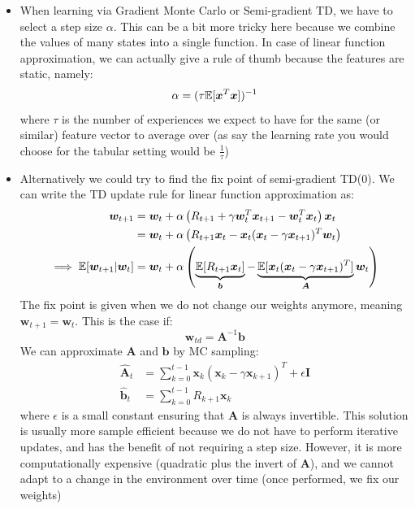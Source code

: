 \begin{itemize}
	\item When learning via Gradient Monte Carlo or Semi-gradient TD, we have to select a step size $\alpha$. This can be a bit more tricky here because we combine the values of many states into a single function. In case of linear function approximation, we can actually give a rule of thumb because the features are static, namely:
	$$\alpha = (\tau\mathbb{E}[\bm{x}^T\bm{x}])^{-1}$$
	where $\tau$ is the number of experiences we expect to have for the same (or similar) feature vector to average over (as say the learning rate you would choose for the tabular setting would be $\frac{1}{\tau}$)
	\item Alternatively we could try to find the fix point of semi-gradient TD(0). We can write the TD update rule for linear function approximation as:
	\begin{equation*}
		\begin{split}
			\bm{w}_{t+1} & = \bm{w}_t + \alpha \left(R_{t+1}+\gamma \bm{w}_t^T \bm{x}_{t+1} - \bm{w}_t^T\bm{x}_t\right)\bm{x}_t\\
			& = \bm{w}_t + \alpha \left(R_{t+1}\bm{x}_t - \bm{x}_t (\bm{x}_t - \gamma \bm{x}_{t+1})^T \bm{w}_t\right)\\
			\implies \mathbb{E}[\bm{w}_{t+1}|\bm{w}_t] & = \bm{w}_t + \alpha \left(\underbrace{\mathbb{E}[R_{t+1}\bm{x}_t]}_{\bm{b}} - \underbrace{\mathbb{E}[\bm{x}_t (\bm{x}_t - \gamma \bm{x}_{t+1})^T]}_{\bm{A}} \bm{w}_t\right)\\
		\end{split}
	\end{equation*}
	The fix point is given when we do not change our weights anymore, meaning $\bm{w}_{t+1}=\bm{w}_t$. This is the case if:
	$$\bm{w}_{td}=\bm{A}^{-1}\bm{b}$$
	We can approximate $\bm{A}$ and $\bm{b}$ by MC sampling:
	\begin{equation*}
		\begin{split}
			\hat{\bm{A}}_t & = \sum_{k=0}^{t-1}\bm{x}_k\left(\bm{x}_k - \gamma\bm{x}_{k+1}\right)^T + \epsilon\bm{I}\\
			\hat{\bm{b}}_t & = \sum_{k=0}^{t-1}R_{k+1}\bm{x}_k
		\end{split}
	\end{equation*}
	where $\epsilon$ is a small constant ensuring that $\bm{\hat{A}}$ is always invertible. This solution is usually more sample efficient because we do not have to perform iterative updates, and has the benefit of not requiring a step size. However, it is more computationally expensive (quadratic plus the invert of $\bm{A}$), and we cannot adapt to a change in the environment over time (once performed, we fix our weights)
\end{itemize}
